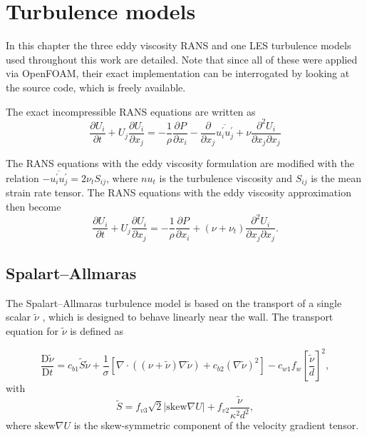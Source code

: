 \chapter{Turbulence models}\label{chap:turbulence-models}
\doublespace

In this chapter the three eddy viscosity RANS and one LES turbulence models used
throughout this work are detailed. Note that since all of these were applied via
OpenFOAM, their exact implementation can be interrogated by looking at the
source code, which is freely available.

The exact incompressible RANS equations are written as
\begin{equation}
    \frac{\partial U_i}{\partial t}
    + U_j \frac{\partial U_i}{\partial x_j}
    =
    -\frac{1}{\rho}\frac{\partial P}{\partial x_i}
    - \frac{\partial}{\partial x_j} \overline{u_i^\prime u_j^\prime}
    + \nu \frac{\partial^2 U_i}{\partial x_j \partial x_j}
\end{equation}

The RANS equations with the eddy viscosity formulation are modified with the
relation $-\overline{u_i^\prime u_j^\prime} = 2 \nu_t S_{ij}$, where $nu_t$ is
the turbulence viscosity and $S_{ij}$ is the mean strain rate tensor. The RANS
equations with the eddy viscosity approximation then become
\begin{equation}
    \frac{\partial U_i}{\partial t}
    + U_j \frac{\partial U_i}{\partial x_j}
    =
    -\frac{1}{\rho}\frac{\partial P}{\partial x_i}
    + (\nu + \nu_t) \frac{\partial^2 U_i}{\partial x_j \partial x_j}.
\end{equation}


\section{Spalart--Allmaras}

The Spalart--Allmaras turbulence model is based on the transport of a single
scalar $\tilde{\nu}$ \cite{Spalart1992}, which is designed to behave linearly
near the wall. The transport equation for $\tilde{\nu}$ is defined as

\begin{equation}
    \frac{\mathrm{D} \tilde{\nu}}{\mathrm{D} t}
    = c_{b1} \tilde{S} \tilde{\nu}
    + \frac{1}{\sigma}
    \left[
    \nabla \cdot \left( (\nu + \tilde{\nu}) \nabla \tilde{\nu} \right)
    + c_{b2} (\nabla \tilde{\nu})^2
    \right]
    - c_{w1} f_w \left[ \frac{\tilde{\nu}}{d} \right]^2,
    \label{eq:SA-nutilde}
\end{equation}
with
\begin{equation}
    \tilde{S} = f_{v3}\sqrt{2} | \mathrm{skew} \nabla U |
    + f_{v2} \frac{\tilde{\nu}}{\kappa^2 d^2},
\end{equation}
where $\mathrm{skew} \nabla U$ is the skew-symmetric component of the velocity
gradient tensor.

